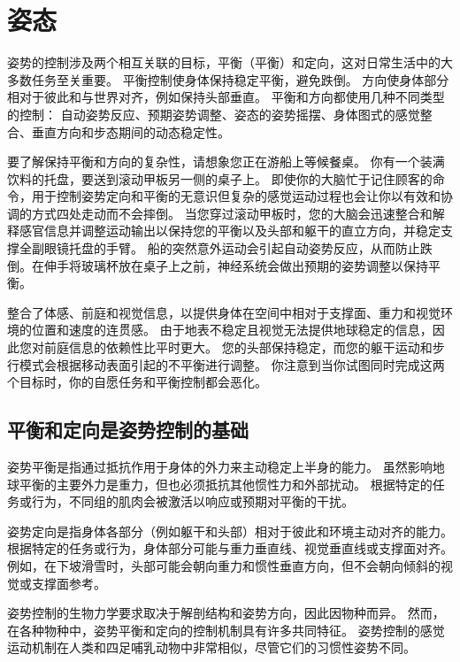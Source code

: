 \chapter{姿态} \label{chap:chap36}

姿势的控制涉及两个相互关联的目标，平衡（平衡）和定向，这对日常生活中的大多数任务至关重要。
平衡控制使身体保持稳定平衡，避免跌倒。
方向使身体部分相对于彼此和与世界对齐，例如保持头部垂直。
平衡和方向都使用几种不同类型的控制：
自动姿势反应、预期姿势调整、姿态的姿势摇摆、身体图式的感觉整合、垂直方向和步态期间的动态稳定性。


要了解保持平衡和方向的复杂性，请想象您正在游船上等候餐桌。
你有一个装满饮料的托盘，要送到滚动甲板另一侧的桌子上。
即使你的大脑忙于记住顾客的命令，用于控制姿势定向和平衡的无意识但复杂的感觉运动过程也会让你以有效和协调的方式四处走动而不会摔倒。
当您穿过滚动甲板时，您的大脑会迅速整合和解释感官信息并调整运动输出以保持您的平衡以及头部和躯干的直立方向，并稳定支撑全副眼镜托盘的手臂。
船的突然意外运动会引起自动姿势反应，从而防止跌倒。在伸手将玻璃杯放在桌子上之前，神经系统会做出预期的姿势调整以保持平衡。


整合了体感、前庭和视觉信息，以提供身体在空间中相对于支撑面、重力和视觉环境的位置和速度的连贯感。
由于地表不稳定且视觉无法提供地球稳定的信息，因此您对前庭信息的依赖性比平时更大。
您的头部保持稳定，而您的躯干运动和步行模式会根据移动表面引起的不平衡进行调整。
你注意到当你试图同时完成这两个目标时，你的自愿任务和平衡控制都会恶化。



\section{平衡和定向是姿势控制的基础}

姿势平衡是指通过抵抗作用于身体的外力来主动稳定上半身的能力。
虽然影响地球平衡的主要外力是重力，但也必须抵抗其他惯性力和外部扰动。
根据特定的任务或行为，不同组的肌肉会被激活以响应或预期对平衡的干扰。


姿势定向是指身体各部分（例如躯干和头部）相对于彼此和环境主动对齐的能力。
根据特定的任务或行为，身体部分可能与重力垂直线、视觉垂直线或支撑面对齐。
例如，在下坡滑雪时，头部可能会朝向重力和惯性垂直方向，但不会朝向倾斜的视觉或支撑面参考。


姿势控制的生物力学要求取决于解剖结构和姿势方向，因此因物种而异。
然而，在各种物种中，姿势平衡和定向的控制机制具有许多共同特征。
姿势控制的感觉运动机制在人类和四足哺乳动物中非常相似，尽管它们的习惯性姿势不同。



